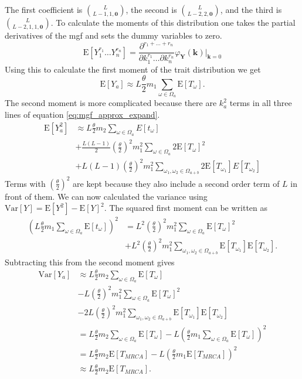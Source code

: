 \documentclass{article}
\newcommand{\T}{\frac{\theta}{2}}
\newcommand{\E}{\mathrm{E}}
\newcommand{\Var}{\mathrm{Var}}
\begin{document}
The first coefficient is $\binom{L}{L-1,1,\mathbf{0}}$, the second is
$\binom{L}{L-2,2,\mathbf{0}}$, and the third is $\binom{L}{L-2,1,1,\mathbf{0}}$.
To calculate the moments of this distribution one takes the partial derivatives
of the mgf and sets the dummy variables to zero.
\begin{equation}
  \label{eq:deriv}
  \E[Y_1^{r_1}\ldots Y_n^{r_n}] = \frac{\partial^{r_1 + \ldots + r_n}}{\partial k_1^{r_1} \ldots \partial k_n^{r_n}}
  \varphi_{\mathbf{Y}}(\mathbf{k})\Bigr|_{\mathbf{k}=0}
\end{equation}
Using this to calculate the first moment of the trait distribution we get
\begin{equation}
  \label{eq:mom1}
  \E[Y_a] \approx L\T m_1 \sum_{\omega \in \Omega_a} \E[T_\omega].
\end{equation}
The second moment is more complicated because there are $k_a^2$ terms in all
three lines of equation \ref{eq:mgf_approx_expand}.
\begin{align}
  \E[Y_a^2] &\approx L\T m_2 \sum_{\omega \in \Omega_a} E[t_\omega] \nonumber \\
  &+ \frac{L(L-1)}{2} \left(\T \right)^2 m_1^2 \sum_{\omega \in \Omega_a} 2 \E[T_\omega]^2 \nonumber \\
  &+ L(L-1) \left(\T \right)^2 m_1^2 \sum_{\omega_1 , \omega_2 \in \Omega_{a+b}} 2 \E[T_{\omega_1}]E[T_{\omega_2}]
\end{align}
Terms with $(\T)^2$ are kept because they also include a second order term of
$L$ in front of them. We can now calculated the variance using $\Var[Y]=\E[Y^2] -
\E[Y]^2$. The squared first moment can be written as
\begin{align}
  \left(L\T m_1 \sum_{\omega \in \Omega_a} \E[t_\omega] \right)^2 &=
  L^2\left(\T\right)^2 m_1^2 \sum_{\omega \in \Omega_a} \E[T_\omega]^2 \nonumber \\
  &+ L^2\left(\T\right)^2 m_1^2 \sum_{\omega_1 , \omega_2 \in \Omega_{a+b}} \E[T_{\omega_1}]\E[T_{\omega_2}].
\end{align}
Subtracting this from the second moment gives
\begin{align}
  \label{eq:var}
  \Var[Y_a] &\approx L\T m_2 \sum_{\omega \in \Omega_a} \E[T_\omega] \nonumber \\
  &- L \left(\T\right)^2 m_1^2 \sum_{\omega \in \Omega_a}\E[T_\omega]^2 \nonumber \\
  &-  2L \left(\T\right)^2 m_1^2 \sum_{\omega_1 , \omega_2 \in \Omega_{a+b}} \E[T_{\omega_1}]\E[T_{\omega_2}] \nonumber \\
  &= L\T m_2 \sum_{\omega \in \Omega_a} \E[T_\omega] -
  L\left( \T m_1 \sum_{\omega \in \Omega_a} \E[T_\omega] \right)^2 \nonumber \\
  &= L\T m_2 \E[T_{MRCA}] - L\left( \T m_1 \E[T_{MRCA}] \right)^2  \\
  &\approx L\T m_2 \E[T_{MRCA}].  \nonumber
\end{align}
\end{document}
